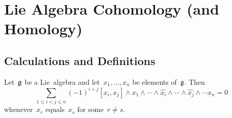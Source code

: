 %   
% 


%  
%  
%  





\section{Lie Algebra Cohomology (and Homology)}



\subsection{Calculations and Definitions}

\begin{lemma}
  \label{alternating in multiple arguments}
  Let~$\mathfrak{g}$ be a Lie~algebra and let~$x_1, \dotsc, x_n$ be elements of~$\mathfrak{g}$.
  Then
  \[
    \sum_{1 \leq i < j \leq n}
    (-1)^{i+j}
    [x_i, x_j] \wedge x_1 \wedge \dotsb \wedge \widehat{x_i} \wedge \dotsb \wedge \widehat{x_j} \wedge \dotsb x_n
    =
    0
  \]
  whenever~$x_r$ equals~$x_s$ for some~$r \neq s$.
\end{lemma}



